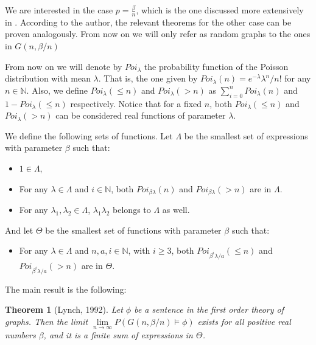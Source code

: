 \documentclass[11pt,notitlepage]{report}
\newtheorem{theorem}{Theorem}[chapter]
\theoremstyle{definition}
\newcommand{\N}{\mathbb{N}}
\begin{document}
We are interested in the case $p=\frac{\beta}{n}$, which is 
the one discussed more extensively in \cite{lynch1992probabilities}. 
According to the author, the relevant theorems for 
the other case can be proven analogously. From now on we
will only refer as random graphs to the ones in $G(n,\beta/n)$\par

From now on we will denote by $Poi_\lambda$ the probability
function of the Poisson distribution with mean $\lambda$.
That is, the one given by $Poi_\lambda(n)=e^{-\lambda}\lambda^n/n!$ 
for any $n\in \N$.
Also, we define $Poi_\lambda(\leq n)$ and $Poi_\lambda(>n)$ as 
$\sum_{i=0}^n Poi_\lambda(n)$ and $1-Poi_\lambda(\leq n)$
respectively. Notice that for a fixed $n$, both $Poi_\lambda(\leq n)$ 
and $Poi_\lambda(>n)$ can be considered real functions of parameter $\lambda$. \par

We define the following sets of functions. Let $\Lambda$ be the smallest 
set of expressions with parameter $\beta$ such that:

\begin{itemize}[noitemsep, topsep=0pt]
	\item $1\in \Lambda$,
	\item For any $\lambda \in \Lambda$ and $i\in \N$, 
	both $Poi_{\beta\lambda}(n)$ and $Poi_{\beta\lambda}(> n)$ are in
	$\Lambda$.
	\item For any $\lambda_1,\lambda_2 \in \Lambda$,
	$\lambda_1 \lambda_2$ belongs to $\Lambda$ as well.
\end{itemize}

And let $\Theta$ be the smallest set of functions with parameter $\beta$
such that:
\begin{itemize}[noitemsep, topsep=0pt]
	\item For any $\lambda \in \Lambda$ 
	and $n,a,i\in \N$, with $i\geq 3$, 
	both $Poi_{\beta^i\lambda/a}(\leq n)$ and $Poi_{\beta^i\lambda/a}(> n)$
	are in $\Theta$.
\end{itemize} 

The main result is the following:

\begin{theorem}[Lynch, 1992] \label{thrm:main}
	Let $\phi$ be a sentence in the first order theory of graphs. Then the limit
	$\lim\limits_{n\to \infty} P(G(n,\beta/n) \models \phi )$ exists for all positive real numbers
	$\beta$, and it is a finite sum of expressions in $\Theta$.
\end{theorem}
\end{document}
